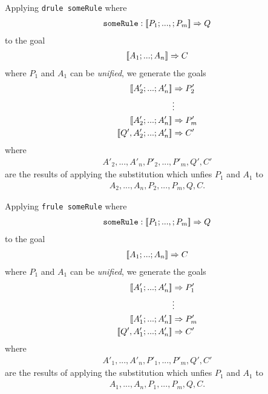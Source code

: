 \documentclass{article}
\begin{document}
\begin{definition}
	Applying \texttt{drule someRule} where
	\begin{align*}
		\texttt{someRule} : [\![P_1;...,;P_m]\!] \Rightarrow Q
	\end{align*}
	to the goal
	\begin{align*}
		[\![A_1; ...; A_n]\!] \Rightarrow C
	\end{align*}
	where $P_1$ and $A_1$ can be \emph{unified}, we generate the goals
	\begin{align*}
		\db{A'_2; ...; A'_n}    & \Rightarrow P'_2 \\
		                        & \vdots           \\
		\db{A'_2; ...; A'_n}    & \Rightarrow P'_m \\
		\db{Q',A'_2; ...; A'_n} & \Rightarrow C'
	\end{align*}
	where \begin{align*}
		A'_2, ..., A'_n,P'_2,...,P'_m,Q',C'
	\end{align*}
	are the results of applying the
	substitution which unfies $P_1$ and $A_1$ to
	\begin{align*}
		A_2,...,A_n,P_2,...,P_m,Q,C.
	\end{align*}
\end{definition}
\begin{definition}
	Applying \texttt{frule someRule} where
	\begin{align*}
		\texttt{someRule} : [\![P_1;...,;P_m]\!] \Rightarrow Q
	\end{align*}
	to the goal
	\begin{align*}
		[\![A_1; ...; A_n]\!] \Rightarrow C
	\end{align*}
	where $P_1$ and $A_1$ can be \emph{unified}, we generate the goals
	\begin{align*}
		\db{A'_1; ...; A'_n}    & \Rightarrow P'_1 \\
		                        & \vdots           \\
		\db{A'_1; ...; A'_n}    & \Rightarrow P'_m \\
		\db{Q',A'_1; ...; A'_n} & \Rightarrow C'
	\end{align*}
	where \begin{align*}
		A'_1, ..., A'_n,P'_1,...,P'_m,Q',C'
	\end{align*}
	are the results of applying the
	substitution which unfies $P_1$ and $A_1$ to
	\begin{align*}
		A_1,...,A_n,P_1,...,P_m,Q,C.
	\end{align*}
\end{definition}
\end{document}

